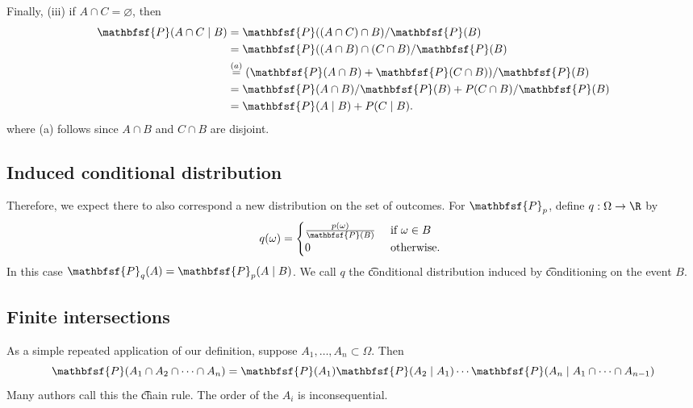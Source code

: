 Finally, (iii) if $A \cap  C = \varnothing$, then
    \[
\begin{aligned}
\mathbfsf{P} (A \cap  C \mid  B)
&=
\mathbfsf{P} ((A \cap  C) \cap  B)/\mathbfsf{P} (B) \\
&=
\mathbfsf{P} ((A \cap  B) \cap  (C \cap  B)/\mathbfsf{P} (B) \\
&\overset{(a)}{=}
(\mathbfsf{P} (A \cap  B) + \mathbfsf{P} (C \cap B))/\mathbfsf{P} (B) \\
&=
\mathbfsf{P} (A \cap  B)/\mathbfsf{P} (B) + P(C \cap B)/\mathbfsf{P} (B) \\
&=
\mathbfsf{P} (A \mid  B) + P(C \mid  B).
\end{aligned}
    \]
where (a) follows since $A \cap  B$ and $C \cap  B$ are disjoint.

\subsection*{Induced conditional distribution}

Therefore, we expect there to also correspond a new distribution on the set of outcomes.
For $\mathbfsf{P} _p$, define $q: \Omega  \to \R $ by
    \[
q(\omega ) = \begin{cases}
\frac{p(\omega )}{\mathbfsf{P} (B)} & \text{ if } \omega  \in B \\
0 & \text{ otherwise. } \\
\end{cases}
    \]
In this case $\mathbfsf{P} _q(A) = \mathbfsf{P} _p(A \mid  B)$.
We call $q$ the \t{conditional distribution} induced by \t{conditioning on} the event $B$.

\subsection*{Finite intersections}

As a simple repeated application of our definition, suppose $A_1, \dots , A_n \subset \Omega $.
Then
    \[
\mathbfsf{P} (A_1 \cap  A_2 \cap  \cdots \cap  A_n) = \mathbfsf{P} (A_1) \mathbfsf{P} (A_2 \mid  A_1) \cdots \mathbfsf{P} (A_n \mid  A_1 \cap  \cdots \cap  A_{n-1})
    \]
Many authors call this the \t{chain rule}. The order of the $A_i$ is inconsequential.
